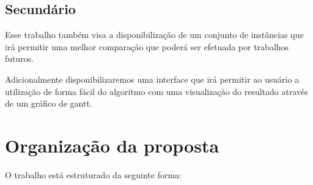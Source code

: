 \subsection{Secundário}

Esse trabalho também visa a disponibilização de um conjunto de instâncias que
irá permitir uma melhor comparação que poderá ser efetuada por trabalhos
futuros.

Adicionalmente disponibilizaremos uma interface que irá permitir ao usuário a
utilização de forma fácil do algoritmo com uma visualização do resultado através
de um gráfico de gantt.

\section {Organização da proposta }

O trabalho está estruturado da seguinte forma:

